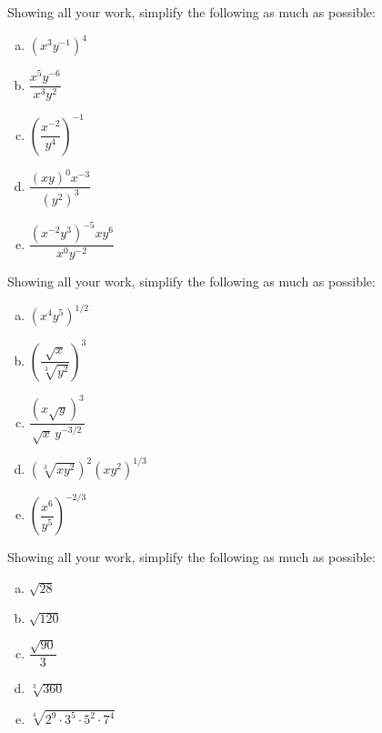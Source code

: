 \documentclass[11pt,letterpaper]{article}
\begin{document}

 Showing all your work, simplify the following as much as possible:
\begin{enumerate}[(a)]
\item $(x^3 y^{-1})^4$
\item $\dfrac{x^5y^{-6}}{x^3y^2}$
\item $\left( \dfrac{x^{-2}}{y^4} \right)^{-1}$
\item $\dfrac{(xy)^0 x^{-3}}{(y^2)^3}$
\item $\dfrac{(x^{-2} y^3)^{-5} xy^6}{x^0 y^{-2}}$
\end{enumerate}



\newpage



 Showing all your work, simplify the following as much as possible:
\begin{enumerate}[(a)]
\item $(x^4 y^5)^{1/2}$
\item $\left( \dfrac{\sqrt{x}}{\sqrt[3]{y^2}} \right)^3$
\item $\dfrac{(x \sqrt{y})^{3}}{\sqrt{x}\, y^{-3/2}}$
\item $(\sqrt[3]{x y^2})^2 (xy^2)^{1/3}$
\item $\left( \dfrac{x^6}{y^5} \right)^{-2/3}$
\end{enumerate}



\newpage



 Showing all your work, simplify the following as much as possible:
\begin{enumerate}[(a)]
\item $\sqrt{28}$
\item $\sqrt{120}$
\item $\dfrac{\sqrt{90}}{3}$
\item $\sqrt[3]{360}$
\item $\sqrt[4]{2^9 \cdot 3^5 \cdot 5^2 \cdot 7^4}$
\end{enumerate}



\newpage
\end{document}
